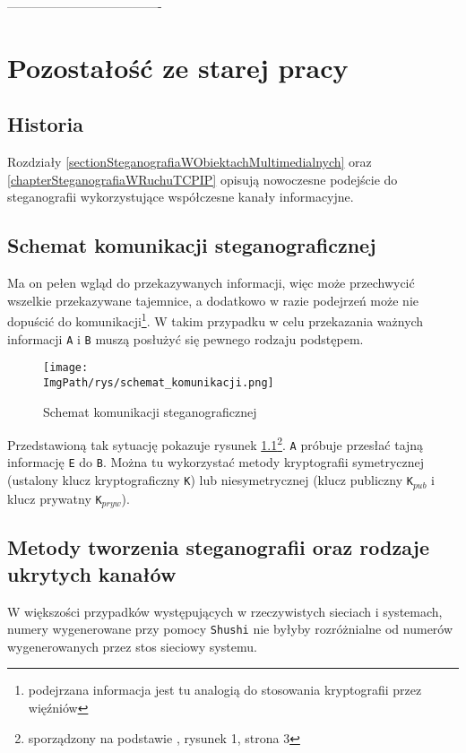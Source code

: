 \documentclass[a4paper,12pt,twoside,openany]{report}
\newcommand{\ImgPath}{.}
\newcommand{\tech}{\texttt}
\begin{document}
-------------------------------------
\chapter{Pozostałość ze starej pracy}

\section{Historia}

Rozdziały \ref{sectionSteganografiaWObiektachMultimedialnych} oraz 
\ref{chapterSteganografiaWRuchuTCPIP} opisują nowoczesne podejście do 
steganografii wykorzystujące współczesne kanały informacyjne. 
\section{Schemat komunikacji steganograficznej}
\label{sectionSchematKomunikacjiSteganograficznej}
 Ma on pełen wgląd do przekazywanych 
informacji, więc może przechwycić wszelkie przekazywane tajemnice, a dodatkowo w 
razie podejrzeń może nie dopuścić do komunikacji\footnote{podejrzana informacja 
jest tu analogią do stosowania kryptografii przez więźniów}. W takim przypadku w 
celu przekazania ważnych informacji \tech{A} i \tech{B} muszą posłużyć się 
pewnego rodzaju podstępem. 
\begin{figure}[!htbp]
	\begin{center}
\centering
\texttt{[image: \\ImgPath/rys/schemat\_komunikacji.png]}
\end{center}
	\caption{Schemat komunikacji steganograficznej}
	\label{schematKomunikacji}
\end{figure}

Przedstawioną tak sytuację pokazuje rysunek 
\ref{schematKomunikacji}\footnote{sporządzony na podstawie 
\cite{schematKomunikacjiPrzypis}, rysunek 1, strona 3}. \tech{A} próbuje 
przesłać tajną informację \tech{E} do \tech{B}. Można tu wykorzystać metody kryptografii symetrycznej (ustalony 
klucz kryptograficzny \tech{K}) lub niesymetrycznej (klucz publiczny 
\tech{K}$_{pub}$ i klucz prywatny \tech{K}$_{pryw}$).

\section{Metody tworzenia steganografii oraz rodzaje ukrytych kanałów}
 W większości przypadków występujących w rzeczywistych sieciach i 
systemach, numery wygenerowane przy pomocy \tech{Shushi} nie byłyby rozróżnialne 
od numerów wygenerowanych przez stos sieciowy systemu.
\end{document}

